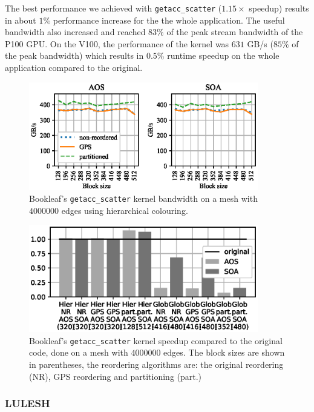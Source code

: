 The best performance we achieved with \texttt{getacc\_scatter} ($1.15\times$ 
speedup) results in about $1\%$ performance increase for the the whole 
application. The useful bandwidth also increased and reached $83\%$ of the peak 
stream bandwidth of the P100 GPU.
On the V100, the performance of the kernel was $631$ GB/s ($85\%$ of the peak
bandwidth) which results in $0.5\%$ runtime speedup on the whole application
compared to the original.

\begin{figure}[Htbp]
\centering
\includegraphics[width=10cm]{fig/bookleaf_bw-vs-bs_hier.eps}
\caption{Bookleaf's \texttt{getacc\_scatter} kernel bandwidth on a mesh with 
$4000000$ edges using hierarchical colouring.}
  \label{fig:bookleaf_bw-vs-bs_hier}
\end{figure}

\begin{figure}[Htbp]
\centering
\includegraphics[width=10cm]{fig/bookleaf_speedup.eps}
\caption{Bookleaf's \texttt{getacc\_scatter} kernel speedup compared to the 
original code, done on a mesh with $4000000$ edges. The block sizes are shown 
in parentheses, the reordering algorithms are: the original reordering (NR), 
GPS reordering and partitioning (part.)}
  \label{fig:bookleaf_speedup}
\end{figure}


\subsubsection{LULESH}\label{sec:lulesh-summary}

